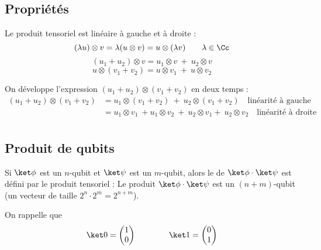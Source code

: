 \documentclass[11pt,class=report,crop=false]{standalone}
\begin{document}
\subsection{Propriétés}

\begin{proposition}
Le produit tensoriel est linéaire à gauche et à droite :
$$(\lambda u) \otimes v = \lambda (u \otimes v) = u \otimes (\lambda v) \qquad \lambda\in\Cc$$
$$(u_1+u_2) \otimes v = u_1 \otimes v \  + \  u_2 \otimes v$$
$$u \otimes (v_1+v_2) = u \otimes v_1 \ + \  u \otimes v_2$$
\end{proposition}

\begin{exemple}
On développe l'expression $(u_1+u_2)\otimes(v_1+v_2)$ en deux temps :
\begin{align*}
(u_1+u_2)\otimes(v_1+v_2) 
  &= u_1 \otimes(v_1+v_2) \  + \ u_2\otimes(v_1+v_2)  \quad \text{linéarité à gauche} \\
  &= u_1 \otimes v_1 \  +u_1 \otimes v_2 \  + \ u_2\otimes v_1 + \ u_2\otimes v_2  \quad \text{linéarité à droite} \\
\end{align*}
\end{exemple}


\subsection{Produit de qubits}


Si $\ket\phi$ est un $n$-qubit et $\ket\psi$ est un $m$-qubit, alors
le  de $\ket\phi \cdot \ket\psi$ est défini par le produit tensoriel :
\mybox{$\ket\phi \cdot \ket\psi = \ket \phi \otimes \ket \psi$}
Le produit $\ket\phi \cdot \ket\psi$ est un $(n+m)$-qubit (un vecteur de taille $2^n\cdot 2^m = 2^{n+m}$).

On rappelle que 
$$\ket0 = \begin{pmatrix}1\\0\end{pmatrix}
\qquad\qquad \ket1 = \begin{pmatrix}0\\1\end{pmatrix}$$
\end{document}
